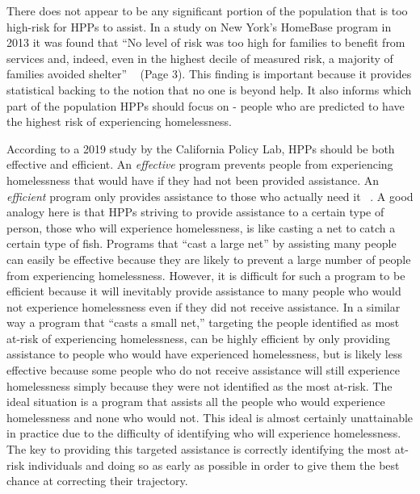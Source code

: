 \documentclass[10pt,letterpaper]{article}
\begin{document}
There does not appear to be any significant portion of the population that is too high-risk for HPPs to assist. In a study on New York's HomeBase program in 2013 it was found that ``No level of risk was too high for families to benefit from services and, indeed, even in the highest decile of measured risk, a majority of families avoided shelter'' ~\cite{shinn2013efficient} (Page 3). This finding is important because it provides statistical backing to the notion that no one is beyond help. It also informs which part of the population HPPs should focus on - people who are predicted to have the highest risk of experiencing homelessness.

According to a 2019 study by the California Policy Lab, HPPs should be both effective and efficient. An \textit{effective} program prevents people from experiencing homelessness that would have if they had not been provided assistance. An \textit{efficient} program only provides assistance to those who actually need it ~\cite{PredictPreventHmlsnsLA}. A good analogy here is that HPPs striving to provide assistance to a certain type of person, those who will experience homelessness, is like casting a net to catch a certain type of fish. Programs that ``cast a large net'' by assisting many people can easily be effective because they are likely to prevent a large number of people from experiencing homelessness. However, it is difficult for such a program to be efficient because it will inevitably provide assistance to many people who would not experience homelessness even if they did not receive assistance. In a similar way a program that ``casts a small net,'' targeting the people identified as most at-risk of experiencing homelessness, can be highly efficient by only providing assistance to people who would have experienced homelessness, but is likely less effective because some people who do not receive assistance will still experience homelessness simply because they were not identified as the most at-risk. The ideal situation is a program that assists all the people who would experience homelessness and none who would not. This ideal is almost certainly unattainable in practice due to the difficulty of identifying who will experience homelessness. The key to providing this targeted assistance is correctly identifying the most at-risk individuals and doing so as early as possible in order to give them the best chance at correcting their trajectory.
\end{document}
